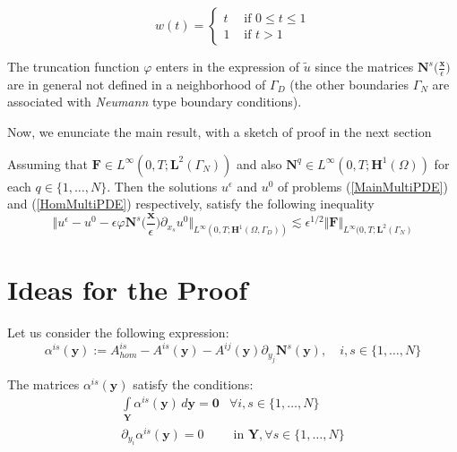 \begin{equation*}
    w(t) = 
    \left \{
    \begin{array}{cc}
        t & \text{ if } 0 \leq t \leq 1 \\
        1 & \text{ if } t > 1
    \end{array}
    \right .
\end{equation*}

\begin{rem}
The truncation function $\varphi$ enters in the expression of $\tilde{u}$ since the matrices $\mathbf{N}^s \big(\frac{\mathbf{x}}{\epsilon}\big)$ are in general not defined in a neighborhood of $\Gamma_D$ (the other boundaries $\Gamma_N$ are associated with \textit{Neumann} type boundary conditions).
\end{rem}

Now, we enunciate the main result, with a sketch of proof in the next section
\begin{theo}
Assuming that $\mathbf{F} \in L^{\infty}(0,T;\mathbf{L}^{2}(\Gamma_N))$ and also $\mathbf{N}^q \in L^{\infty}(0,T; \mathbf{H}^1(\Omega))$ for each $q \in \{1,\dots, N\}$. Then the solutions $u^{\epsilon}$ and $u^0$ of problems (\ref{MainMultiPDE}) and (\ref{HomMultiPDE}) respectively, satisfy the following inequality
\begin{equation*}
    \label{MainInequality}
    \Vert u^{\epsilon} - u^0 - \epsilon \varphi \mathbf{N}^s \big(\frac{\mathbf{x}}{\epsilon} \big) \partial_{x_s} u^0 \Vert_{L^{\infty}(0,T; \mathbf{H}^1(\Omega, \Gamma_D))} \lesssim \epsilon^{1/2} \Vert \mathbf{F}\Vert_{L^{\infty}(0,T; \mathbf{L}^{2}(\Gamma_N)}
\end{equation*}
\end{theo}

\section{Ideas for the Proof}
Let us consider the following expression:
\begin{equation*}
    \alpha^{is}(\mathbf{y}) := A^{is}_{hom} - A^{is}(\mathbf{y}) - A^{ij}(\mathbf{y}) \partial_{y_j} \mathbf{N}^s(\mathbf{y}), \quad i,s \in \{1,\dots, N\}
\end{equation*}
\begin{lem}
The matrices $\alpha^{is}(\mathbf{y})$ satisfy the conditions:
\begin{equation}
    \label{AlphaCondition}
    \begin{array}{cc}
         \int \limits_{\mathbf{Y}} \alpha^{is}(\mathbf{y}) \, d\mathbf{y} = \mathbf{0} & \forall i,s \in \{1,\dots, N\} \\
         \partial_{y_i} \alpha^{is}(\mathbf{y}) = 0 & \text{ in }\mathbf{Y}, \forall s \in \{1,\dots, N\}
    \end{array}
\end{equation}
\end{lem}

